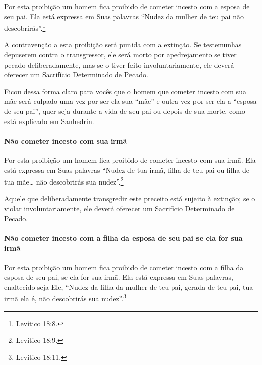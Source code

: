 \begin{multicols}{2}
Por esta proibição um homem fica proibido de cometer incesto com a
esposa de seu pai. Ela está expressa em Suas palavras ``Nudez da mulher
de teu pai não descobrirás''.\footnote{Levítico 18:8.}

A contravenção a esta proibição será punida com a extinção. Se
testemunhas depuserem contra o transgressor, ele será morto por
apedrejamento se tiver pecado deliberadamente, mas se o tiver feito
involuntariamente, ele deverá oferecer um Sacrifício Determinado de
Pecado.

Ficou dessa forma claro para vocês que o homem que cometer incesto com
sua mãe será culpado uma vez por ser ela sua ``mãe'' e outra vez por ser
ela a ``esposa de seu pai'', quer seja durante a vida de seu pai ou
depois de sua morte, como está explicado em Sanhedrin\starr.

\paragraph{Não cometer incesto com sua irmã}

Por esta proibição um homem fica proibido de cometer incesto com sua
irmã. Ela está expressa em Suas palavras ``Nudez de tua irmã, filha de
teu pai ou filha de tua mãe\ldots{} não descobrirás sua nudez''.\footnote{Levítico
18:9.}

Aquele que deliberadamente transgredir este preceito está sujeito à
extinção; se o violar involuntariamente, ele deverá oferecer um
Sacrifício Determinado de Pecado.

\paragraph{Não cometer incesto com a filha da esposa de seu pai se ela for sua irmã}

Por esta proibição um homem fica proibido de cometer incesto com a filha
da esposa de seu pai, se ela for sua irmã. Ela está expressa em Suas
palavras, enaltecido seja Ele, ``Nudez da filha da mulher de teu pai,
gerada de teu pai, tua irmã ela é, não descobrirás sua nudez''.\footnote{Levítico
18:11.}


\end{multicols}
